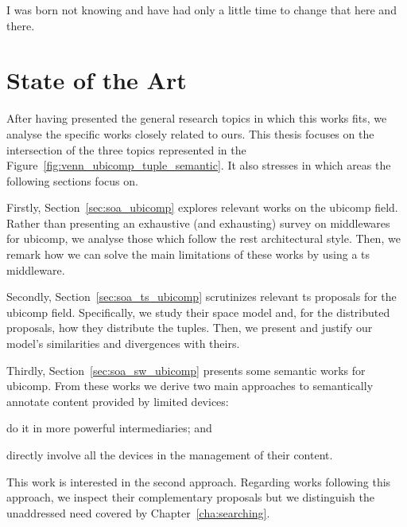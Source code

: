 
\begin{savequote}[50mm]
I was born not knowing and have had only a little time to change that here and there.
\end{savequote}


\chapter{State of the Art}
\label{cha:stateoftheart}

\ifpdf
    \graphicspath{{\pathchapthree/figures/PNG/}{\pathchapthree/figures/PDF/}{\pathchapthree/figures/}}
\else
    \graphicspath{{\pathchapthree/figures/EPS/}{\pathchapthree/figures/}}
\fi



After having presented the general research topics in which this works fits, we analyse the specific works closely related to ours.
This thesis focuses on the intersection of the three topics represented in the Figure~\ref{fig:venn_ubicomp_tuple_semantic}. %
It also stresses in which areas the following sections focus on.


Firstly, Section~\ref{sec:soa_ubicomp} explores relevant works on the \ac{ubicomp} field.
Rather than presenting an exhaustive (and exhausting) survey on middlewares for \ac{ubicomp},
we analyse those which follow the \ac{rest} architectural style.
Then, we remark how we can solve the main limitations of these works by using a \ac{ts} middleware.


Secondly, Section~\ref{sec:soa_ts_ubicomp} scrutinizes relevant \ac{ts} proposals for the \ac{ubicomp} field.
Specifically, we study their space model and, for the distributed proposals, how they distribute the tuples.
Then, we present and justify our model's similarities and divergences with theirs.


Thirdly, Section~\ref{sec:soa_sw_ubicomp} presents some semantic works for \ac{ubicomp}.
From these works we derive two main approaches to semantically annotate content provided by limited devices:
\begin{enumerate*}[label=\itshape\alph*\upshape)]
  \item do it in more powerful intermediaries; and
  \item directly involve all the devices in the management of their content.
\end{enumerate*}
This work is interested in the second approach.
Regarding works following this approach, we inspect their complementary proposals but we distinguish the unaddressed need covered by Chapter~\ref{cha:searching}. %


